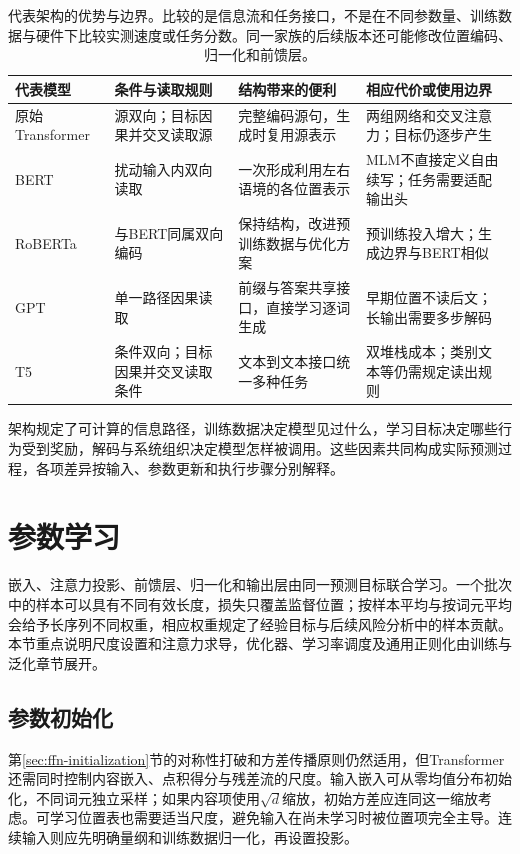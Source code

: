\begin{table}[htbp]
  \centering
  \small
  \begin{tabular}{@{}p{24mm}p{34mm}p{47mm}p{50mm}@{}}
    \toprule
    代表模型 & 条件与读取规则 & 结构带来的便利 & 相应代价或使用边界 \\
    \midrule
    原始Transformer & 源双向；目标因果并交叉读取源 & 完整编码源句，生成时复用源表示 & 两组网络和交叉注意力；目标仍逐步产生 \\
    BERT & 扰动输入内双向读取 & 一次形成利用左右语境的各位置表示 & MLM不直接定义自由续写；任务需要适配输出头 \\
    RoBERTa & 与BERT同属双向编码 & 保持结构，改进预训练数据与优化方案 & 预训练投入增大；生成边界与BERT相似 \\
    GPT & 单一路径因果读取 & 前缀与答案共享接口，直接学习逐词生成 & 早期位置不读后文；长输出需要多步解码 \\
    T5 & 条件双向；目标因果并交叉读取条件 & 文本到文本接口统一多种任务 & 双堆栈成本；类别文本等仍需规定读出规则 \\
    \bottomrule
  \end{tabular}
  \caption{代表架构的优势与边界。比较的是信息流和任务接口，不是在不同参数量、训练数据与硬件下比较实测速度或任务分数。同一家族的后续版本还可能修改位置编码、归一化和前馈层。}
  \label{tab:transformer-common-architectures}
\end{table}
\FloatBarrier

架构规定了可计算的信息路径，训练数据决定模型见过什么，学习目标决定哪些行为受到奖励，解码与系统组织决定模型怎样被调用。这些因素共同构成实际预测过程，各项差异按输入、参数更新和执行步骤分别解释。


\section{参数学习}
\label{sec:transformer-learning}

嵌入、注意力投影、前馈层、归一化和输出层由同一预测目标联合学习。一个批次中的样本可以具有不同有效长度，损失只覆盖监督位置；按样本平均与按词元平均会给予长序列不同权重，相应权重规定了经验目标与后续风险分析中的样本贡献。本节重点说明尺度设置和注意力求导，优化器、学习率调度及通用正则化由训练与泛化章节展开。

\subsection{参数初始化}
\label{sec:transformer-initialization}

第\ref{sec:ffn-initialization}节的对称性打破和方差传播原则仍然适用，但Transformer还需同时控制内容嵌入、点积得分与残差流的尺度。输入嵌入可从零均值分布初始化，不同词元独立采样；如果内容项使用$\sqrt d$缩放，初始方差应连同这一缩放考虑。可学习位置表也需要适当尺度，避免输入在尚未学习时被位置项完全主导。连续输入则应先明确量纲和训练数据归一化，再设置投影。

